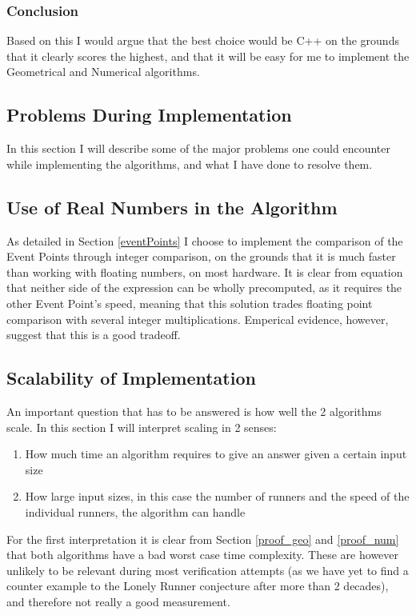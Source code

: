 \subsubsection{Conclusion}
Based on this I would argue that the best choice would be C++ on the grounds that it clearly scores the highest, and that it will be easy for me to implement the Geometrical and Numerical algorithms.

\subsection{Problems During Implementation}
In this section I will describe some of the major problems one could encounter while implementing the algorithms, and what I have done to resolve them.

\subsection{Use of Real Numbers in the Algorithm}
As detailed in Section \ref{eventPoints} I choose to implement the comparison of the Event Points through integer comparison, on the grounds that it is much faster than working with floating numbers, on most hardware. It is clear from equation  that neither side of the expression can be wholly precomputed, as it requires the other Event Point's speed, meaning that this solution trades floating point comparison with several integer multiplications. Emperical evidence, however, suggest that this is a good tradeoff.

\subsection{Scalability of Implementation}
\label{scale}
An important question that has to be answered is how well the 2 algorithms scale. In this section I will interpret scaling in 2 senses:
\begin{enumerate}
\item How much time an algorithm requires to give an answer given a certain input size
\item How large input sizes, in this case the number of runners and the speed of the individual runners, the algorithm can handle
\end{enumerate}

For the first interpretation it is clear from Section \ref{proof_geo} and \ref{proof_num} that both algorithms have a bad worst case time complexity. These are however unlikely to be relevant during most verification attempts (as we have yet to find a counter example to the Lonely Runner conjecture after more than 2 decades), and therefore not really a good measurement. 

